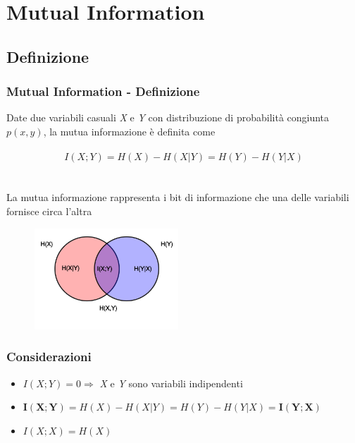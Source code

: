 \documentclass{beamer}
\begin{document}
\section{Mutual Information}
\subsection{Definizione}
\begin{frame}
	\frametitle{Mutual Information - Definizione}
		\nocite{Ding:2003:MRF:937976.938050}
		\nocite{Peng05featureselection}
Date due variabili casuali \emph{X} e \emph{Y} con distribuzione di probabilità congiunta $p(x, y)$, la mutua
informazione è definita come \\~$$I(X; Y ) = H(X) − H(X|Y ) = H(Y ) − H(Y |X)$$\\~\\
La mutua informazione rappresenta i bit di informazione che una delle variabili fornisce circa l'altra
\begin{figure}[htb]
	\vspace{-0.2cm}
	\includegraphics[width=0.48\textwidth]{figure/mutual.png}
\end{figure}
\end{frame}
\begin{frame}
	\frametitle{Considerazioni}
	\begin{itemize}
		\item $I(X;Y)=0 \Rightarrow$ \emph{X} e \emph{Y} sono variabili indipendenti
		\item $\pmb{I(X;Y)} = H(X)-H(X|Y)=H(Y)-H(Y|X)= \pmb{I(Y;X)}$
		\item $I(X;X)=H(X)$
	\end{itemize}
\end{frame}
\end{document}
